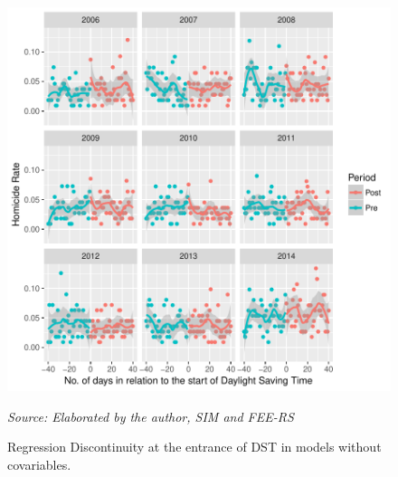 \documentclass[12pt,openright,oneside,a4paper,english,french,spanish]{abntex2}
\numberwithin{table}{section} %
\numberwithin{figure}{section} %
\newcommand{\source}[1]{\textit{#1}}
\begin{document}
\begin{otherlanguage}{english}
\begin{figure}[H]
\begin{center}
\includegraphics{TESE_DE_DOUTORADO_RENAN_FINAL-plot_resultados_rdd_entradaHV_RS}
\end{center}
\caption{Regression Discontinuity at the entrance of DST in models without covariables.}
\source{Source: Elaborated by the author, SIM and FEE-RS}
\label{fig:resultado_rdd_entrada}
\end{figure}





\end{otherlanguage}
\end{document}
